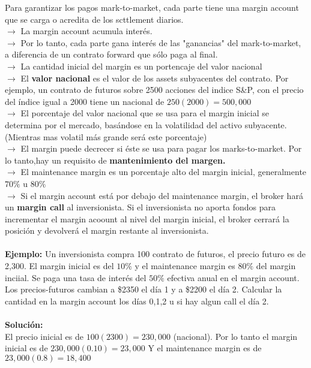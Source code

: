\documentclass[12pts]{extarticle}
\begin{document}
Para garantizar los pagos mark-to-market, cada parte tiene una margin account que se carga o acredita de los scttlement diarios. 
 \\$\rightarrow$ La margin account acumula interés.
 \\$\rightarrow$ Por lo tanto, cada parte gana interés de las "ganancias" del mark-to-market, a diferencia de un contrato forward que sólo paga al final. 
 \\$\rightarrow$ La cantidad inicial del margin es un portencaje del valor nacional
 \\$\rightarrow$ El \textbf{valor nacional} es el valor de los assets subyacentes del contrato. Por ejemplo, un contrato de futuros sobre 2500 acciones del indice S\&P, con el precio del índice igual a 2000 tiene un nacional de $250(2000)=500,000$
 \\$\rightarrow$ El porcentaje del valor nacional que se usa para el margin inicial se determina por el mercado, basándose en la volatilidad del activo subyacente.(Mientras mas volatil más grande será este porcentaje) 
 \\$\rightarrow$ El margin puede decrecer si éste se usa para pagar los marks-to-market. Por lo tanto,hay un requisito de \textbf{mantenimiento del margen.}
 \\$\rightarrow$ El maintenance margin es un porcentaje alto del margin inicial, generalmente $70\%$ u $80\%$ 
 \\$\rightarrow$ Si el margin account está por debajo del maintenance margin, el broker hará un \textbf{margin call} al inversionista. Si el inversionista no aporta fondos para incrementar el margin acoount al nivel del margin inicial, el broker cerrará la posición y devolverá el margin restante al inversionista. 
\\ \\
\textbf{Ejemplo:} Un inversionista compra 100 contrato de futuros, el precio futuro es de 2,300. El margin inicial es del $10\%$ y el maintenance margin es $80\%$ del margin inciial. Se paga una tasa de interés del $50\% $ efectiva anual en el margin account. Los precios-futuros cambian a \$2350 el día 1 y a \$2200 el día 2. Calcular la cantidad en la margin account los días 0,1,2 u si hay algun call el día 2. 
\\ \\ 
\textbf{Solución:}
\\ 
El precio inicial es de $100(2300)=230,000$ (nacional). Por lo tanto el margin inicial es de $230,000(0.10)=23,000$ Y el maintenance margin es de $23,000(0.8)=18,400$ 
\end{document}
